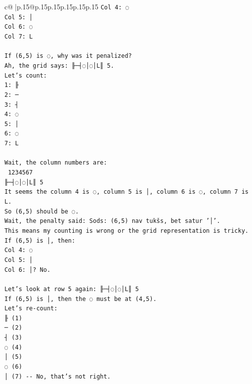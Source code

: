 \documentclass{article}
\begin{document}
{\begin{supertabular}{c@{$\;$}|p{.15\linewidth}@{}p{.15\linewidth}p{.15\linewidth}p{.15\linewidth}p{.15\linewidth}p{.15\linewidth}}
{{{\texttt{Col 4: ◌} \\
\texttt{Col 5: │} \\
\texttt{Col 6: ◌} \\
\texttt{Col 7: L} \\
\\ 
\texttt{If (6,5) is ◌, why was it penalized?} \\
\texttt{Ah, the grid says: ╟─┤◌│◌│L║ 5.} \\
\texttt{Let's count:} \\
\texttt{1: ╟} \\
\texttt{2: ─} \\
\texttt{3: ┤} \\
\texttt{4: ◌} \\
\texttt{5: │} \\
\texttt{6: ◌} \\
\texttt{7: L} \\
\\ 
\texttt{Wait, the column numbers are:} \\
\texttt{ 1234567} \\
\texttt{╟─┤◌│◌│L║ 5} \\
\texttt{It seems the column 4 is ◌, column 5 is │, column 6 is ◌, column 7 is L.} \\
\texttt{So (6,5) should be ◌.} \\
\texttt{Wait, the penalty said: Sods: (6,5) nav tukšs, bet satur '│'.} \\
\texttt{This means my counting is wrong or the grid representation is tricky.} \\
\texttt{If (6,5) is │, then:} \\
\texttt{Col 4: ◌} \\
\texttt{Col 5: │} \\
\texttt{Col 6: │? No.} \\
\\ 
\texttt{Let's look at row 5 again: ╟─┤◌│◌│L║ 5} \\
\texttt{If (6,5) is │, then the ◌ must be at (4,5).} \\
\texttt{Let's re{-}count:} \\
\texttt{╟ (1)} \\
\texttt{─ (2)} \\
\texttt{┤ (3)} \\
\texttt{◌ (4)} \\
\texttt{│ (5)} \\
\texttt{◌ (6)} \\
\texttt{│ (7) {-}{-} No, that's not right.} \\
}}}
\end{supertabular}}
\end{document}
